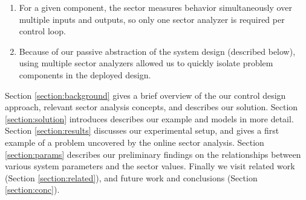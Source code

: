 \begin{enumerate}
 \item For a given component, the sector measures behavior simultaneously over multiple inputs and 
outputs, so only one sector analyzer is required per control loop.
 \item Because of our passive abstraction of the system design (described below), using multiple
sector analyzers allowed us to quickly isolate problem components in the deployed design.
\end{enumerate}


Section \ref{section:background} gives a brief overview of the our control design approach,
relevant sector analysis concepts, and describes our solution.   Section \ref{section:solution} 
introduces describes our example and models in more detail.  Section \ref{section:results} 
discusses our experimental setup, and gives a first example of a problem uncovered by the online 
sector analysis.  Section \ref{section:params} describes our preliminary findings on the 
relationships between various system parameters and the sector values.   Finally we visit 
related work (Section \ref{section:related}), and future work and conclusions 
(Section \ref{section:conc}).
